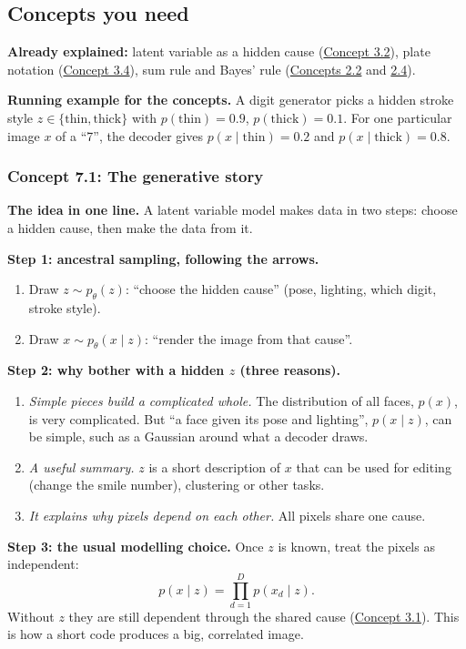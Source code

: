 \documentclass[12pt,a4paper]{article}
\begin{document}
\subsection{Concepts you need}

\textbf{Already explained:} latent variable as a hidden cause (\hyperref[c3-2]{Concept 3.2}), plate notation (\hyperref[c3-4]{Concept 3.4}), sum rule and Bayes' rule (\hyperref[c2-2]{Concepts 2.2} and \hyperref[c2-4]{2.4}).

\textbf{Running example for the concepts.} A digit generator picks a hidden stroke style $z\in\{\text{thin},\text{thick}\}$ with $p(\text{thin})=0.9$, $p(\text{thick})=0.1$. For one particular image $x$ of a ``7'', the decoder gives $p(x\mid\text{thin})=0.2$ and $p(x\mid\text{thick})=0.8$.

\subsubsection{Concept 7.1: The generative story}\label{c7-1}

\textbf{The idea in one line.} A latent variable model makes data in two steps: choose a hidden cause, then make the data from it.

\textbf{Step 1: ancestral sampling, following the arrows.}
\begin{enumerate}[nosep]
  \item Draw $z\sim p_\theta(z)$: ``choose the hidden cause'' (pose, lighting, which digit, stroke style).
  \item Draw $x\sim p_\theta(x\mid z)$: ``render the image from that cause''.
\end{enumerate}

\textbf{Step 2: why bother with a hidden $z$ (three reasons).}
\begin{enumerate}[nosep]
  \item \emph{Simple pieces build a complicated whole.} The distribution of all faces, $p(x)$, is very complicated. But ``a face given its pose and lighting'', $p(x\mid z)$, can be simple, such as a Gaussian around what a decoder draws.
  \item \emph{A useful summary.} $z$ is a short description of $x$ that can be used for editing (change the smile number), clustering or other tasks.
  \item \emph{It explains why pixels depend on each other.} All pixels share one cause.
\end{enumerate}

\textbf{Step 3: the usual modelling choice.} Once $z$ is known, treat the pixels as independent:
\[
p(x\mid z)=\prod_{d=1}^{D}p(x_d\mid z).
\]
Without $z$ they are still dependent through the shared cause (\hyperref[c3-1]{Concept 3.1}). This is how a short code produces a big, correlated image.
\end{document}

